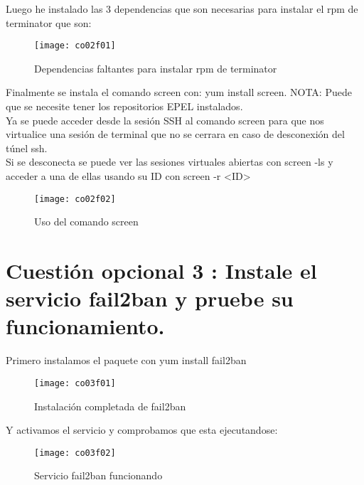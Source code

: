 Luego he instalado las 3 dependencias que son necesarias para instalar el rpm de terminator que son:\\

\begin{figure}[H]
	\centering
	\texttt{[image: co02f01]}
	\caption{Dependencias faltantes para instalar rpm de terminator}
	\label{fig:co06f01}
\end{figure}

Finalmente se instala el comando screen con: yum install screen. NOTA: Puede que se necesite tener los repositorios EPEL instalados. \cite{09o201} \\

Ya se puede acceder desde la sesión SSH al comando screen para que nos virtualice una sesión de terminal que no se cerrara en caso de desconexión del túnel ssh. \\
Si se desconecta se puede ver las sesiones virtuales abiertas con screen -ls y acceder a una de ellas usando su ID con screen -r <ID> \cite{09o202} \\

\begin{figure}[H]
	\centering
	\texttt{[image: co02f02]}
	\caption{Uso del comando screen}
	\label{fig:co06f02}
\end{figure}



\section{Cuestión opcional 3 : Instale el servicio fail2ban y pruebe su funcionamiento.}


Primero instalamos el paquete con yum install fail2ban \\

\begin{figure}[H]
	\centering
	\texttt{[image: co03f01]}
	\caption{Instalación completada de fail2ban}
	\label{fig:co06f02}
\end{figure}

Y activamos el servicio y comprobamos que esta ejecutandose: \\

\begin{figure}[H]
	\centering
	\texttt{[image: co03f02]}
	\caption{Servicio fail2ban funcionando}
	\label{fig:co06f02}
\end{figure}


